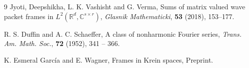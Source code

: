 \documentclass[article,12pt]{amsart}
\begin{document}
\begin{thebibliography}{9}
Jyoti, Deepshikha, L. K. Vashisht and G. Verma, Sums of matrix valued wave packet frames in $L^2(\mathbb R^d, \mathbb C^{s \times r})$,  \emph{Glasnik Mathematicki}, \textbf{ 53} (2018), 153--177.

 R. S. Duffin and A. C. Schaeffer, A class of nonharmonic Fourier series, \emph{Trans. Am. Math. Soc.}, \textbf{72} (1952), 341 -- 366.
















 K. Esmeral Garc\'{i}a and  E. Wagner, Frames in Krein spaces, Preprint.


\end{thebibliography}
\end{document}

